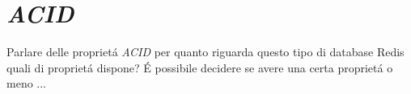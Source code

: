 \chapter{\emph{ACID}}
Parlare delle proprietá \emph{ACID} per quanto riguarda questo tipo di database
Redis quali di proprietá dispone?
É possibile decidere se avere una certa proprietá o meno ...
